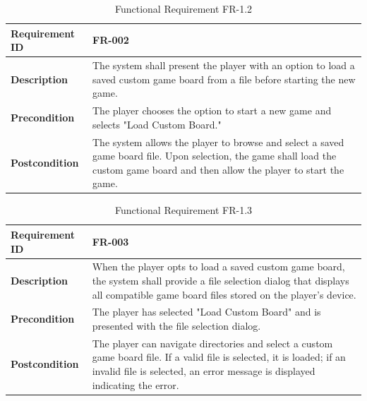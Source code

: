 \documentclass{article}
\begin{document}
\begin{table}[ht]
    \centering
    \caption{Functional Requirement FR-1.2}
    \begin{tabular}{@{}P{3cm}P{12cm}@{}}
        \toprule
        \textbf{Requirement ID} & FR-002 \\ \midrule
        \textbf{Description} & The system shall present the player with an option to load a saved custom game board from a file before starting the new game. \\ \midrule
        \textbf{Precondition} & The player chooses the option to start a new game and selects "Load Custom Board." \\ \midrule
        \textbf{Postcondition} & The system allows the player to browse and select a saved game board file. Upon selection, the game shall load the custom game board and then allow the player to start the game. \\ \bottomrule
    \end{tabular}
\end{table}

\begin{table}[ht]
    \centering
    \caption{Functional Requirement FR-1.3}
    \begin{tabular}{@{}P{3cm}P{12cm}@{}}
        \toprule
        \textbf{Requirement ID} & FR-003 \\ \midrule
        \textbf{Description} & When the player opts to load a saved custom game board, the system shall provide a file selection dialog that displays all compatible game board files stored on the player's device. \\ \midrule
        \textbf{Precondition} & The player has selected "Load Custom Board" and is presented with the file selection dialog. \\ \midrule
        \textbf{Postcondition} & The player can navigate directories and select a custom game board file. If a valid file is selected, it is loaded; if an invalid file is selected, an error message is displayed indicating the error. \\ \bottomrule
    \end{tabular}
\end{table}
\end{document}
